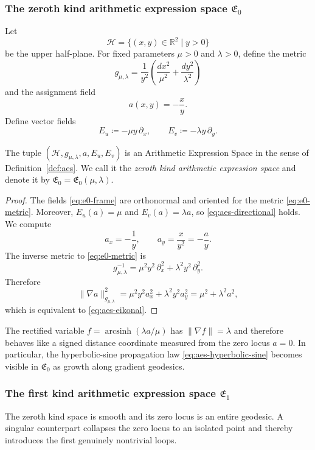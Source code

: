 \subsubsection*{The zeroth kind arithmetic expression space \texorpdfstring{$\mathfrak{E}_0$}{E0}}
Let
\[
\mathcal{H}=\{(x,y)\in\mathbb{R}^2\mid y>0\}
\]
be the upper half-plane. For fixed parameters $\mu>0$ and $\lambda>0$, define the metric
\begin{equation}\label{eq:e0-metric}
g_{\mu,\lambda}=\frac{1}{y^2}\left(\frac{dx^2}{\mu^2}+\frac{dy^2}{\lambda^2}\right)
\end{equation}
and the assignment field
\begin{equation}\label{eq:e0-assignment}
a(x,y)=-\frac{x}{y}.
\end{equation}
Define vector fields
\begin{equation}\label{eq:e0-frame}
E_u\coloneqq -\mu y\,\partial_x,
\qquad
E_v\coloneqq -\lambda y\,\partial_y.
\end{equation}

\begin{theorem}\label{thm:aes-e0}
The tuple $(\mathcal{H},g_{\mu,\lambda},a,E_u,E_v)$ is an Arithmetic Expression Space in the sense of Definition~\ref{def:aes}. We call it the \emph{zeroth kind arithmetic expression space} and denote it by $\mathfrak{E}_0=\mathfrak{E}_0(\mu,\lambda)$.
\end{theorem}

\begin{proof}
The fields \eqref{eq:e0-frame} are orthonormal and oriented for the metric \eqref{eq:e0-metric}. Moreover, $E_u(a)=\mu$ and $E_v(a)=\lambda a$, so \eqref{eq:aes-directional} holds.
We compute
\[
a_x=-\frac{1}{y},
\qquad
a_y=\frac{x}{y^2}=-\frac{a}{y}.
\]
The inverse metric to \eqref{eq:e0-metric} is
\[
g_{\mu,\lambda}^{-1}=\mu^2 y^2\,\partial_x^2+\lambda^2 y^2\,\partial_y^2.
\]
Therefore
\[
\|\nabla a\|_{g_{\mu,\lambda}}^2
=\mu^2 y^2 a_x^2+\lambda^2 y^2 a_y^2
=\mu^2+\lambda^2 a^2,
\]
which is equivalent to \eqref{eq:aes-eikonal}.
\end{proof}

The rectified variable $f=\operatorname{arcsinh}(\lambda a/\mu)$ has $\|\nabla f\|=\lambda$ and therefore behaves like a signed distance coordinate measured from the zero locus $a=0$. In particular, the hyperbolic-sine propagation law \eqref{eq:aes-hyperbolic-sine} becomes visible in $\mathfrak{E}_0$ as growth along gradient geodesics.

\subsubsection*{The first kind arithmetic expression space \texorpdfstring{$\mathfrak{E}_1$}{E1}}
The zeroth kind space is smooth and its zero locus is an entire geodesic. A singular counterpart collapses the zero locus to an isolated point and thereby introduces the first genuinely nontrivial loops.

